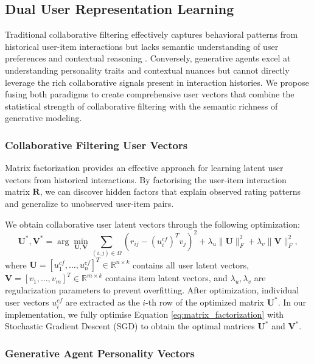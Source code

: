 \documentclass[acmsmall]{acmart}
\begin{document}
\subsection{Dual User Representation Learning}
\label{sec:dual_representation}

Traditional collaborative filtering effectively captures behavioral patterns from historical user-item interactions but lacks semantic understanding of user preferences and contextual reasoning \cite{wang2025mitigating}. Conversely, generative agents excel at understanding personality traits and contextual nuances but cannot directly leverage the rich collaborative signals present in interaction histories. We propose fusing both paradigms to create comprehensive user vectors that combine the statistical strength of collaborative filtering with the semantic richness of generative modeling.

\subsubsection{Collaborative Filtering User Vectors}
\label{sec:cf_vectors}

Matrix factorization provides an effective approach for learning latent user vectors from historical interactions. By factorising the user-item interaction matrix $\mathbf{R}$, we can discover hidden factors that explain observed rating patterns and generalize to unobserved user-item pairs.

We obtain collaborative user latent vectors through the following optimization:
\begin{equation}
\mathbf{U}^*, \mathbf{V}^* = \arg\min_{\mathbf{U}, \mathbf{V}} \sum_{(i,j) \in \Omega} \left(r_{ij} - (u^{cf}_i)^T v_j\right)^2 + \lambda_u \|\mathbf{U}\|^2_F + \lambda_v \|\mathbf{V}\|^2_F,
\label{eq:matrix_factorization}
\end{equation}
where $\mathbf{U} = [u^{cf}_1, \ldots, u^{cf}_n]^T \in \mathbb{R}^{n \times k}$ contains all user latent vectors, $\mathbf{V} = [v_1, \ldots, v_m]^T \in \mathbb{R}^{m \times k}$ contains item latent vectors, and $\lambda_u, \lambda_v$ are regularization parameters to prevent overfitting. After optimization, individual user vectors $u^{cf}_i$ are extracted as the $i$-th row of the optimized matrix $\mathbf{U}^*$. In our implementation, we fully optimise Equation \ref{eq:matrix_factorization} with Stochastic Gradient Descent (SGD) \cite{baltrunas2011incarmusic} to obtain the optimal matrices $\mathbf{U}^*$ and $\mathbf{V}^*$.
\subsubsection{Generative Agent Personality Vectors}
\label{sec:gen_vectors}
\end{document}
